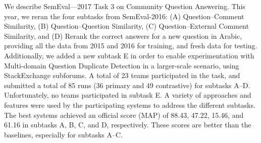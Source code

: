 We describe SemEval---2017 Task 3 on Community Question Answering. This year, we reran the four subtasks from SemEval-2016: (A) Question--Comment Similarity, (B) Question--Question Similarity, (C) Question--External Comment Similarity, and (D) Rerank the correct answers for a new question in Arabic, providing all the data from 2015 and 2016 for training, and fresh data for testing. Additionally, we added a new subtask E in order to enable experimentation with Multi-domain Question Duplicate Detection in a larger-scale scenario, using StackExchange subforums. A total of 23 teams participated in the task, and submitted a total of 85 runs (36 primary and 49 contrastive) for subtasks A--D. Unfortunately, no teams participated in subtask E. A variety of approaches and features were used by the participating systems to address the different subtasks. The best systems achieved an official score (MAP) of 88.43, 47.22, 15.46, and 61.16 in subtasks A, B, C, and D, respectively.  These scores are better than the baselines, especially for subtasks A--C.
